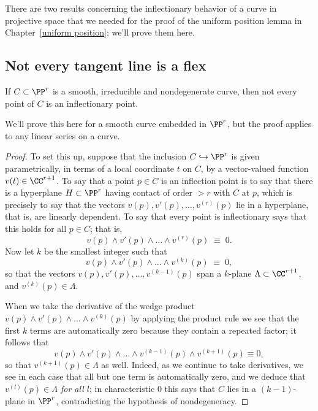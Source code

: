 There are two results concerning the inflectionary behavior of a curve in projective space that we needed for the proof of the uniform position lemma in Chapter~\ref{uniform position}; we'll prove them here.

\subsection{Not every tangent line is a flex}\label{isolated tangents and bitangents}

\begin{lemma}\label{finite infections}
If $C \subset \PP^r$ is a smooth, irreducible and nondegenerate curve, then not every point of $C$ is an inflectionary point.
\end{lemma}

We'll prove this here for a smooth curve embedded in $\PP^r$, but the proof applies to any linear series on a curve.

\begin{proof}
To set this up, suppose that the inclusion $C \hookrightarrow \PP^r$ is given parametrically, in terms of a local coordinate $t$ on $C$, by a vector-valued function $v(t) \in \CC^{r+1}$. To say that a point $p \in C$ is an inflection point is to say that there is a hyperplane $H \subset \PP^r$ having contact of order $>r$ with $C$ at $p$, which is
precisely to say that the vectors $v(p), v'(p), \dots, v^{(r)}(p)$ lie in a hyperplane, that is, are linearly dependent. To say that every point is inflectionary says that this holds for all $p \in C$; that is,
$$
v(p) \wedge v'(p) \wedge \dots \wedge v^{(r)}(p) \; \equiv \; 0.
$$
Now let $k$ be the smallest integer such that
$$
v(p) \wedge v'(p) \wedge \dots \wedge v^{(k)}(p) \; \equiv \; 0,
$$
so that the vectors $v(p), v'(p), \dots, v^{(k-1)}(p)$ span a $k$-plane $\Lambda \subset \CC^{r+1}$, and $v^{(k)}(p) \in \Lambda$.

When we take the derivative of the wedge product $v(p) \wedge v'(p) \wedge \dots \wedge v^{(k)}(p)$ by applying the product rule we see that the first $k$ terms are automatically zero because they contain a repeated factor; it follows that
$$
v(p) \wedge v'(p) \wedge \dots \wedge v^{(k-1)}(p)\wedge v^{(k+1)}(p) \equiv 0,
$$
so that $v^{(k+1)}(p) \in \Lambda$ as well. Indeed, as we continue to take derivatives, we see in each case that all but one term is automatically zero, and we deduce that \emph{$v^{(l)}(p) \in \Lambda$ for all $l$}; in characteristic 0 this says that $C$ lies in a $(k-1)$-plane in $\PP^r$, contradicting the hypothesis of nondegeneracy.
\end{proof}

